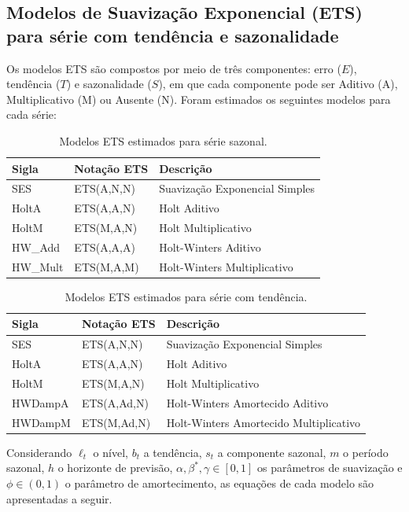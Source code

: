 \documentclass[12pt, a4paper]{article}
\begin{document}
\subsection{Modelos de Suavização Exponencial (ETS) para série com tendência e sazonalidade}

Os modelos ETS \citep{hyndman2008forecasting} são compostos
por meio de três componentes: erro ($E$), tendência ($T$) e
sazonalidade ($S$), em que cada componente pode ser Aditivo (A), Multiplicativo
(M) ou Ausente (N). Foram estimados os seguintes modelos para cada série:

\begin{table}[H]
  \centering
  \caption{Modelos ETS estimados para série sazonal.}
  \label{tab:ets_sazonal}
  \begin{tabular}{lll}
    \toprule
    \textbf{Sigla} & \textbf{Notação ETS} & \textbf{Descrição} \\
    \midrule
    SES     & ETS(A,N,N) & Suavização Exponencial Simples \\
    HoltA   & ETS(A,A,N) & Holt Aditivo \\
    HoltM   & ETS(M,A,N) & Holt Multiplicativo \\
    HW\_Add  & ETS(A,A,A) & Holt-Winters Aditivo \\
    HW\_Mult & ETS(M,A,M) & Holt-Winters Multiplicativo \\
    \bottomrule
  \end{tabular}
\end{table}

\begin{table}[H]
  \centering
  \caption{Modelos ETS estimados para série com tendência.}
  \label{tab:ets_tendencia}
  \begin{tabular}{lll}
    \toprule
    \textbf{Sigla} & \textbf{Notação ETS} & \textbf{Descrição} \\
    \midrule
    SES     & ETS(A,N,N) & Suavização Exponencial Simples \\
    HoltA   & ETS(A,A,N) & Holt Aditivo \\
    HoltM   & ETS(M,A,N) & Holt Multiplicativo \\
    HWDampA  & ETS(A,Ad,N) & Holt-Winters Amortecido Aditivo \\
    HWDampM & ETS(M,Ad,N) & Holt-Winters Amortecido Multiplicativo \\
    \bottomrule
  \end{tabular}
\end{table}

Considerando $\ell_t$ o nível, $b_t$ a tendência, $s_t$ a componente sazonal, $m$ o período sazonal, $h$ o horizonte de previsão, $\alpha,\beta^{*},\gamma\in[0,1]$ os parâmetros de suavização e $\phi\in(0,1)$ o parâmetro de amortecimento, as equações de cada modelo são apresentadas a seguir.
\end{document}
